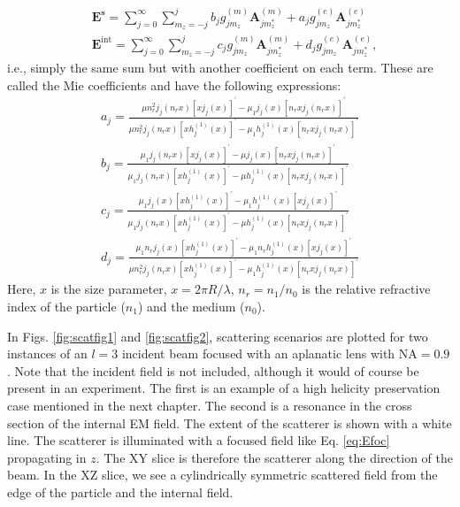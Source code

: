 \begin{align}
& \mathbf{E}^{\mathbf{s}} = \sum_{j=0}^{\infty} \sum_{m_z=-j}^j b_j g_{jm_z}^{(m)} \mathbf{A}_{j m_z^*}^{(m)} + a_j g_{jm_z}^{(e)} \mathbf{A}_{j m_z^*}^{(e)} \label{eq:Mie_S} \\
& \mathbf{E}^{\mathrm{int}} = \sum_{j=0}^{\infty} \sum_{m_z=-j}^j c_j g_{jm_z}^{(m)} \mathbf{A}_{j m_z^*}^{(m)} + d_j g_{jm_z}^{(e)} \mathbf{A}_{j m_z^*}^{(e)} \label{eq:Mie_I},
\end{align}
i.e., simply the same sum but with another coefficient on each term. These are called the Mie coefficients and have the following expressions:
\begin{gather}
a_j = \frac{\mu n_r^2 j_j(n_r x) \left[ x j_j(x) \right]^{\prime} - \mu_1 j_j(x) \left[ n_r x j_j(n_r x) \right]^{\prime}}{\mu n_r^2 j_j(n_r x) \left[ x h_j^{(1)}(x) \right]^{\prime} - \mu_1 h_j^{(1)}(x) \left[ n_r x j_j(n_r x) \right]^{\prime}} \\
b_j = \frac{\mu_1 j_j(n_r x) \left[ x j_j(x) \right]^{\prime} - \mu j_j(x) \left[ n_r x j_j(n_r x) \right]^{\prime}}{\mu_1 j_j(n_r x) \left[ x h_j^{(1)}(x) \right]^{\prime} - \mu h_j^{(1)}(x) \left[ n_r x j_j(n_r x) \right]^{\prime}} \\
c_j = \frac{\mu_1 j_j(x) \left[ x h_j^{(1)}(x) \right]^{\prime} - \mu_1 h_j^{(1)}(x) \left[ x j_j(x) \right]^{\prime}}{\mu_1 j_j(n_r x) \left[ x h_j^{(1)}(x) \right]^{\prime} - \mu h_j^{(1)}(x) \left[ n_r x j_j(n_r x) \right]^{\prime}} \\
d_j = \frac{\mu_1 n_r j_j(x) \left[ x h_j^{(1)}(x) \right]^{\prime} - \mu_1 n_r h_j^{(1)}(x) \left[ x j_j(x) \right]^{\prime}}{\mu n_r^2 j_j(n_r x) \left[ x h_j^{(1)}(x) \right]^{\prime} - \mu_1 h_j^{(1)}(x) \left[ n_r x j_j(n_r x) \right]^{\prime}}
\end{gather}
Here, \( x \) is the size parameter, \( x = 2 \pi R / \lambda \), \( n_r = n_1 / n_0 \) is the relative refractive index of the particle (\( n_1 \)) and the medium (\( n_0 \)).

In Figs. \ref{fig:scatfig1} and \ref{fig:scatfig2}, scattering scenarios are plotted for two instances of an \( l = 3 \) incident beam focused with an aplanatic lens with \( \mathrm{NA} = 0.9 \). Note that the incident field is not included, although it would of course be present in an experiment.
The first is an example of a high helicity preservation case mentioned in the next chapter. The second is a resonance in the cross section of the internal EM field. The extent of the scatterer is shown with a white line. The scatterer is illuminated with a focused field like Eq. \ref{eq:Efoc} propagating in \( z \). The XY slice is therefore the scatterer along the direction of the beam. In the XZ slice, we see a cylindrically symmetric scattered field from the edge of the particle and the internal field.

